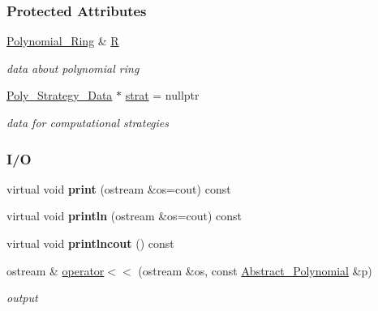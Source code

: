 \subsubsection*{Protected Attributes}
\begin{DoxyCompactItemize}
\item 
\mbox{\label{group__polygroup_a551ade20b7dcd96c227dd0401f6ffbbe}} 
\hyperlink{group__polygroup_class_polynomial___ring}{Polynomial\+\_\+\+Ring} \& \hyperlink{group__polygroup_a551ade20b7dcd96c227dd0401f6ffbbe}{R}
\begin{DoxyCompactList}\small\item\em data about polynomial ring \end{DoxyCompactList}\item 
\mbox{\label{group__polygroup_a764336acff942ed6d6e160b5d62f90c1}} 
\hyperlink{group__strategygroup_class_poly___strategy___data}{Poly\+\_\+\+Strategy\+\_\+\+Data} $\ast$ \hyperlink{group__polygroup_a764336acff942ed6d6e160b5d62f90c1}{strat} = nullptr
\begin{DoxyCompactList}\small\item\em data for computational strategies \end{DoxyCompactList}\end{DoxyCompactItemize}
\subsubsection*{I/O}
\begin{DoxyCompactItemize}
\item 
\mbox{\label{group__polygroup_adbbb6af1fb79d5794af42e28d584641b}} 
virtual void {\bfseries print} (ostream \&os=cout) const
\item 
\mbox{\label{group__polygroup_a597dc990980f1936e86dbf8940dbeecd}} 
virtual void {\bfseries println} (ostream \&os=cout) const
\item 
\mbox{\label{group__polygroup_a69dfd6bd725e126d2476826fb345c5f6}} 
virtual void {\bfseries printlncout} () const
\item 
\mbox{\label{group__polygroup_aadc14212f0cbdb81df9977916cc13798}} 
ostream \& \hyperlink{group__polygroup_aadc14212f0cbdb81df9977916cc13798}{operator$<$$<$} (ostream \&os, const \hyperlink{group__polygroup_class_abstract___polynomial}{Abstract\+\_\+\+Polynomial} \&p)
\begin{DoxyCompactList}\small\item\em output \end{DoxyCompactList}\end{DoxyCompactItemize}


